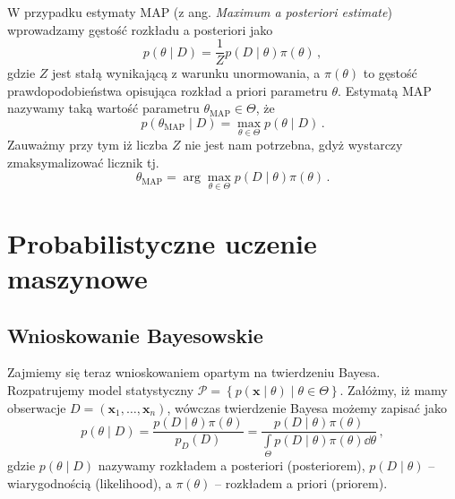 \documentclass{myclass}
\begin{document}
W przypadku estymaty MAP (z ang. \textit{Maximum a posteriori estimate}) wprowadzamy gęstość
rozkładu a posteriori jako
\begin{equation*}
    p(\theta \mid D) = \frac{1}{Z}p(D \mid \theta)\pi(\theta)\,,
\end{equation*}
gdzie \(Z\) jest stałą wynikającą z warunku unormowania, a \(\pi(\theta)\) to gęstość
prawdopodobieństwa opisująca rozkład a priori parametru \(\theta\). Estymatą MAP nazywamy taką
wartość parametru \(\theta_\text{MAP} \in \Theta\), że
\begin{equation*}
    p(\theta_\text{MAP} \mid D) = \max_{\theta \in \Theta} p(\theta \mid D)\,.
\end{equation*}
Zauważmy przy tym iż liczba \(Z\) nie jest nam potrzebna, gdyż wystarczy zmaksymalizować licznik tj.
\begin{equation*}
    \theta_\text{MAP} = \arg\max_{\theta \in \Theta} p(D \mid \theta)\pi(\theta)\,.
\end{equation*}

\linesep
\newpage

\section{Probabilistyczne uczenie maszynowe}

\subsection{Wnioskowanie Bayesowskie}

Zajmiemy się teraz wnioskowaniem opartym na twierdzeniu Bayesa. Rozpatrujemy model statystyczny
\(\mathcal{P} = \left\{p(\mathbf{x} \mid \theta) \mid \theta \in \Theta\right\}\). Załóżmy, iż mamy
obserwacje \(D = (\mathbf{x}_1, \ldots, \mathbf{x}_n)\), wówczas twierdzenie Bayesa możemy zapisać
jako
\begin{equation*}
    p(\theta \mid D) = \frac{p(D \mid \theta)\pi(\theta)}{p_D(D)} = \frac{p(D \mid \theta)\pi(\theta)}{\int\limits_\Theta p(D \mid \theta)\pi(\theta) \dd{\theta}}\,,
\end{equation*}
gdzie \(p(\theta \mid D)\) nazywamy rozkładem a posteriori (posteriorem), \(p(D \mid \theta)\) --
wiarygodnością (likelihood), a \(\pi(\theta)\) -- rozkładem a priori (priorem).
\end{document}
